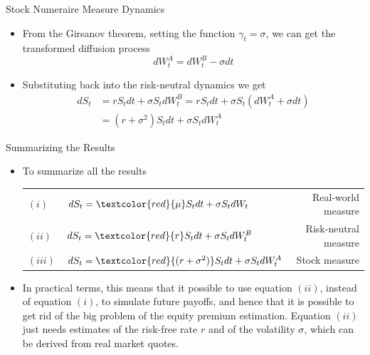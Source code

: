 \documentclass{beamer}
\begin{document}
\begin{frame}{Stock Numeraire Measure Dynamics}
  \begin{itemize}
  \item<1-> From the Girsanov theorem, setting the function $\gamma_t = \sigma$, we can get the transformed diffusion process
    \begin{equation*}
      dW_t^A = dW_t^B - \sigma dt 
    \end{equation*}
  \item<2-> Substituting back into the risk-neutral dynamics we get
    \begin{equation*}
      \begin{aligned}
	dS_t &= r S_t dt + \sigma S_t dW_t^B = 
	rS_t dt + \sigma S_t (dW_t^A + \sigma dt) \\
	& = (r + \sigma^2)S_t dt + \sigma S_t dW^A_t
      \end{aligned}
    \end{equation*}
  \end{itemize}
\end{frame}

\begin{frame}{Summarizing the Results}
  \begin{itemize}
  \item<1-> To summarize all the results
    \vspace{0.5cm}
    \begin{table}
      \begin{tabular}{llr}
	$(i)$&$dS_t = \textcolor{red}{\mu} S_t dt + \sigma S_t dW_t$ & Real-world measure \\
	$(ii)$&$dS_t = \textcolor{red}{r}S_t dt + \sigma S_t dW_t^B$ & Risk-neutral measure \\
	$(iii)$&$dS_t = \textcolor{red}{(r + \sigma^2)}S_t dt + \sigma S_t dW^A_t$ & Stock measure\\
      \end{tabular}
    \end{table}
    \vspace{0.5cm}
  \item<2-> In practical terms, this means that it possible to use equation $(ii)$, instead of equation $(i)$, to simulate future payoffs, and hence that it is possible to get rid of the big problem of the equity premium estimation. Equation $(ii)$ just needs estimates of the risk-free rate $r$ and of the volatility $\sigma$, which can be derived from real market quotes.
  \end{itemize}
	\pause
\end{frame}
\end{document}

